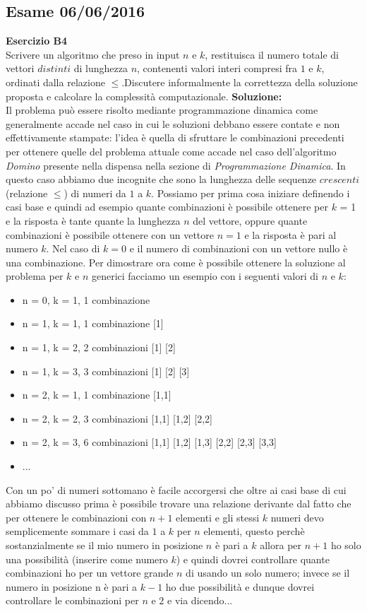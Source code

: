 \documentclass[../cheatSheetAlgoritmi.tex]{subfiles}
\begin{document}
\subsection{Esame 06/06/2016}
\textbf{Esercizio B4}\\
Scrivere un algoritmo che preso in input $n$ e $k$, restituisca il numero totale di vettori $distinti$ di lunghezza $n$, contenenti valori interi compresi fra $1$ e $k$, ordinati dalla relazione $\leq$.Discutere informalmente la correttezza della soluzione proposta e calcolare la complessità computazionale.
\textbf{Soluzione:}\\
Il problema può essere risolto mediante programmazione dinamica come generalmente accade nel caso in cui le soluzioni debbano essere contate e non effettivamente stampate: l'idea è quella di sfruttare le combinazioni precedenti per ottenere quelle del problema attuale come accade nel caso dell'algoritmo \emph{Domino} presente nella dispensa nella sezione di \emph{Programmazione Dinamica}. In questo caso abbiamo due incognite che sono la lunghezza delle sequenze $crescenti$ (relazione $\leq$) di numeri da $1$ a $k$. Possiamo per prima cosa iniziare definendo i casi base e quindi ad esempio quante combinazioni è possibile ottenere per $k$ = 1 e la risposta è tante quante la lunghezza $n$ del vettore, oppure quante combinazioni è possibile ottenere con un vettore $n = 1$ e la risposta è pari al numero $k$. Nel caso di $k = 0$ e il numero di combinazioni con un vettore nullo è una combinazione. Per dimostrare ora come è possibile ottenere la soluzione al problema per $k$ e $n$ generici facciamo un esempio con i seguenti valori di $n$ e $k$:
\begin{itemize}
	\item n = 0, k = 1, 1 combinazione
	\item n = 1, k = 1, 1 combinazione 		[1]
	\item n = 1, k = 2, 2 combinazioni 		[1] [2]
	\item n = 1, k = 3, 3 combinazioni		[1] [2] [3]
	\item n = 2, k = 1, 1 combinazione		[1,1]
	\item n = 2, k = 2, 3 combinazioni		[1,1] [1,2] [2,2]
	\item n = 2, k = 3, 6 combinazioni		[1,1] [1,2] [1,3] [2,2] [2,3] [3,3]
	\item ...
\end{itemize}
Con un po' di numeri sottomano è facile accorgersi che oltre ai casi base di cui abbiamo discusso prima è possibile trovare una relazione derivante dal fatto che per ottenere le combinazioni con $n+1$ elementi e gli stessi $k$ numeri devo semplicemente sommare i casi da $1$ a $k$ per $n$ elementi, questo perchè sostanzialmente se il mio numero in posizione $n$ è pari a $k$ allora per $n+1$ ho solo una possibilità (inserire come numero $k$) e quindi dovrei controllare quante combinazioni ho per un vettore grande $n$ di usando un solo numero; invece se il numero in posizione n è pari a $k-1$ ho due possibilità e dunque dovrei controllare le combinazioni per $n$ e $2$ e via dicendo...\\
\end{document}
